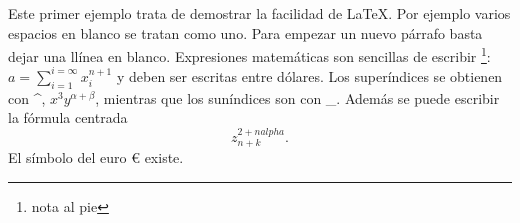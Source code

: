 \documentclass[12pt,a4paper]{article}
\begin{document}
\medskip
Este primer ejemplo trata de demostrar la facilidad de
\LaTeX{}. Por ejemplo varios espacios en blanco
se tratan como uno.
Para empezar un nuevo párrafo basta dejar una llínea en blanco.  Expresiones matemáticas son sencillas de
escribir \footnote{nota al pie}:
$a=\sum_{i=1}^{i=\infty} x_i^{n+1}$ y deben ser escritas
entre dólares. Los superíndices se obtienen con \^{ },
$x^3 y^{\alpha + \beta}$, mientras que los suníndices son con \_.  Además se puede escribir la
fórmula centrada
\[ z^{2+nalpha}_{n+k}. \]
\medskip
El símbolo del euro \euro{} existe.
\end{document}
